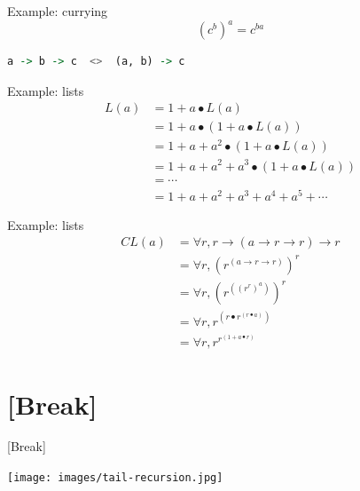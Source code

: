 \documentclass[utf8x,notes,17pt]{beamer}
\begin{document}
\begin{frame}[fragile,label=sec-7-38]{Example: currying}
\[ (c^{b})^{a} = c^{b a} \]

\vspace{1ex}
\begin{center}
\begin{lstlisting}[language=Haskell]
   a -> b -> c  <>  (a, b) -> c
\end{lstlisting}
\end{center}
\end{frame}
\begin{frame}[fragile,label=sec-7-39]{Example: lists}
\vspace{-2ex}
\begin{align*}
L(a) &= 1 + a ∙ L(a)                                      \\
     &= 1 + a ∙ (1 + a ∙ L(a))                            \\
     &= 1 + a + a^{2} ∙ (1 + a ∙ L(a))                    \\
     &= 1 + a + a^{2} + a^{3} ∙ (1 + a ∙ L(a))            \\
     &= \cdots{}                                          \\
     &= 1 + a + a^{2} + a^{3} + a^{4} + a^{5} + \cdots{}
\end{align*}
\end{frame}
\begin{frame}[fragile,label=sec-7-40]{Example: lists}
\vspace{-2ex}
\begin{align*}
CL(a) &= ∀ r, r → (a → r → r) → r     \\
      &= ∀ r, (r^{(a → r → r)})^{r}   \\
      &= ∀ r, (r^{((r^{r})^{a})})^{r} \\
      &= ∀ r, r^{(r ∙ r^{(r ∙ a)})}   \\
      &= ∀ r, r^{r^{(1 + a ∙ r)}}
\end{align*}
\end{frame}
\section{[Break]}
\label{sec-8}
\begin{frame}[fragile,label=sec-8-1]{[Break]}
\begin{center}
\texttt{[image: images/tail-recursion.jpg]}
\end{center}
\end{frame}
\end{document}
